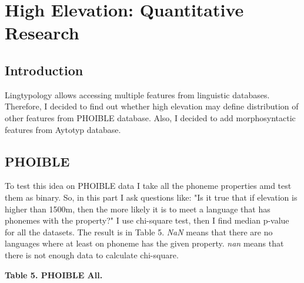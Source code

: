 \documentclass[a4paper,12pt]{article}
\begin{document}
\newpage

\section{High Elevation: Quantitative Research}

\subsection{Introduction}
Lingtypology allows accessing multiple features from linguistic databases. Therefore, I decided to find out whether high elevation may define distribution of other features from PHOIBLE database. Also, I decided to add morphosyntactic features from Aytotyp database.

\subsection{PHOIBLE}

To test this idea on PHOIBLE data I take all the phoneme properties amd test them as binary. So, in this part I ask questions like: "Is it true that if elevation is higher than 1500m, then the more likely it is to meet a language that has phonemes with the property?" I use chi-square test, then I find median p-value for all the datasets.
The result is in Table 5. \textit{NaN} means that there are no languages where at least on phoneme has the given property. \textit{nan} means that there is not enough data to calculate chi-square.

\textbf{Table 5. PHOIBLE All.}
\end{document}
